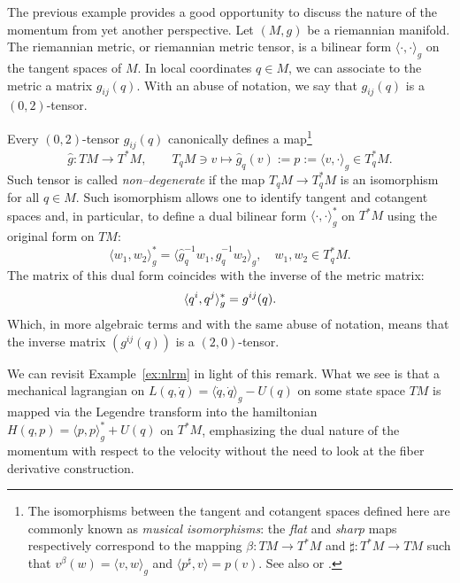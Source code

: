 \documentclass[english,fontsize=11pt,paper=a5,oneside]{scrbook}
\let\d\relax
\newcommand{\d}{\mathrm{d}}
\theoremstyle{definition}
\newenvironment{remark}
  {\pushQED{\qed}\renewcommand{\qedsymbol}{$\lozenge$}\remarkx}
  {\popQED\endremarkx}
\begin{document}
\begin{remark}\label{rem:ptocot}
  The previous example provides a good opportunity to discuss the nature of the momentum from yet another perspective.
  Let $(M, g)$ be a riemannian manifold.
  The riemannian metric, or riemannian metric tensor, is a bilinear form $\langle\cdot, \cdot\rangle_g$ on the tangent spaces of $M$.
  In local coordinates $q\in M$, we can associate to the metric a matrix $g_{ij}(q)$.
  With an abuse of notation, we say that $g_{ij}(q)$ is a $(0,2)$-tensor.

  Every $(0,2)$-tensor $g_{ij}(q)$ canonically defines a map\footnote{The isomorphisms between the tangent and cotangent spaces defined here are commonly known as \emph{musical isomorphisms}: the \emph{flat} and \emph{sharp} maps respectively correspond to the mapping $\beta:TM\to T^*M$ and $\sharp:T^*M\to TM$ such that $v^\beta(w) = \langle v,w\rangle_g$ and $\langle p^\sharp, v\rangle = p(v)$.
  See also \cite[Chapter 11]{book:lee} or \cite[Example 6.1.9]{lectures:aom:seri}.}
  \begin{equation}
    \hat g: TM \to T^*M, \qquad T_q M \ni v \mapsto \hat g_q(v) := p := \langle v, \cdot\rangle_g \in T^*_q M.
  \end{equation}
  Such tensor is called \emph{non--degenerate} if the map $T_qM \to T_q^* M$ is an isomorphism for all $q\in M$.
  Such isomorphism allows one to identify tangent and cotangent spaces and, in particular, to define a dual bilinear form $\langle\cdot, \cdot\rangle_g^*$ on $T^*M$ using the original form on $TM$:
  \begin{equation}
    \langle w_1, w_2\rangle_g^* = \langle\hat g_q^{-1} w_1, \hat g_q^{-1} w_2\rangle_g, \quad w_1,w_2 \in T^*_q M.
  \end{equation}
  The matrix of this dual form coincides with the inverse of the metric matrix:
  \begin{equation}
    \langle\d q^i, \d q^j\rangle_g^* = g^{ij}(q).
  \end{equation}
  Which, in more algebraic terms and with the same abuse of notation, means that the inverse matrix $(g^{ij}(q))$ is a $(2,0)$-tensor.

  
  We can revisit Example~\ref{ex:nlrm} in light of this remark. What we see is that a mechanical lagrangian on $L(q,\dot q) = \langle \dot q, \dot q\rangle_g - U(q)$ on some state space $TM$ is mapped via the Legendre transform into the hamiltonian $H(q, p) = \langle p, p \rangle_g^* + U(q)$ on $T^*M$, emphasizing the dual nature of the momentum with respect to the velocity without the need to look at the fiber derivative construction.
\end{remark}
\end{document}
